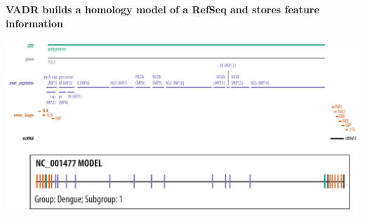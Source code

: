 \documentclass[landscape]{slides}
\begin{document}
%
%
\begin{slide}
\begin{center}
\textbf{VADR builds a homology model of a RefSeq and stores feature information}

\includegraphics[width=10.5in]{figs/dengue-features}

\end{center}
\vfill
\end{slide}
\end{document}
